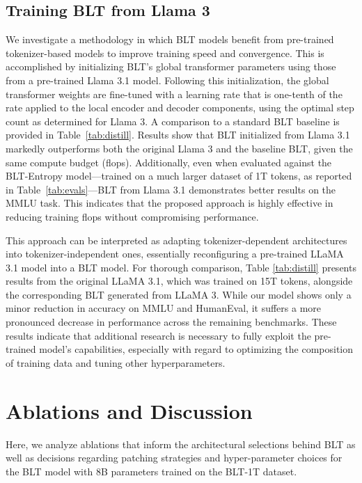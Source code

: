 \subsection{Training {\textsc BLT} from Llama 3}
\label{sec:distillation}
We investigate a methodology in which {\textsc BLT} models benefit from pre-trained tokenizer-based models to improve training speed and convergence. This is accomplished by initializing {\textsc BLT}'s global transformer parameters using those from a pre-trained Llama 3.1 model. Following this initialization, the global transformer weights are fine-tuned with a learning rate that is one-tenth of the rate applied to the local encoder and decoder components, using the optimal step count as determined for Llama 3. A comparison to a standard {\textsc BLT} baseline is provided in Table~\ref{tab:distill}. Results show that {\textsc BLT} initialized from Llama 3.1 markedly outperforms both the original Llama 3 and the baseline {\textsc BLT}, given the same compute budget (flops). Additionally, even when evaluated against the {\textsc BLT}-Entropy model—trained on a much larger dataset of 1T tokens, as reported in Table~\ref{tab:evals}—{\textsc BLT} from Llama 3.1 demonstrates better results on the MMLU task. This indicates that the proposed approach is highly effective in reducing training flops without compromising performance.

This approach can be interpreted as adapting tokenizer-dependent architectures into tokenizer-independent ones, essentially reconfiguring a pre-trained LLaMA 3.1 model into a {\textsc BLT} model. For thorough comparison, Table \ref{tab:distill} presents results from the original LLaMA 3.1, which was trained on 15T tokens, alongside the corresponding {\textsc BLT} generated from LLaMA 3. While our model shows only a minor reduction in accuracy on MMLU and HumanEval, it suffers a more pronounced decrease in performance across the remaining benchmarks. These results indicate that additional research is necessary to fully exploit the pre-trained model’s capabilities, especially with regard to optimizing the composition of training data and tuning other hyperparameters.

\section{Ablations and Discussion}
\label{section:ablations}
Here, we analyze ablations that inform the architectural selections behind {\textsc BLT} as well as decisions regarding patching strategies and hyper-parameter choices for the {\textsc BLT} model with 8B parameters trained on the {\textsc BLT}-1T dataset.

